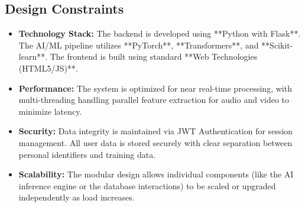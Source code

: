 \subsection{Design Constraints}
\begin{itemize}
    \item \textbf{Technology Stack:} The backend is developed using **Python with Flask**. The AI/ML pipeline utilizes **PyTorch**, **Transformers**, and **Scikit-learn**. The frontend is built using standard **Web Technologies (HTML5/JS)**.
    
    \item \textbf{Performance:} The system is optimized for near real-time processing, with multi-threading handling parallel feature extraction for audio and video to minimize latency.
    
    \item \textbf{Security:} Data integrity is maintained via JWT Authentication for session management. All user data is stored securely with clear separation between personal identifiers and training data.
    
    \item \textbf{Scalability:} The modular design allows individual components (like the AI inference engine or the database interactions) to be scaled or upgraded independently as load increases.
\end{itemize}
